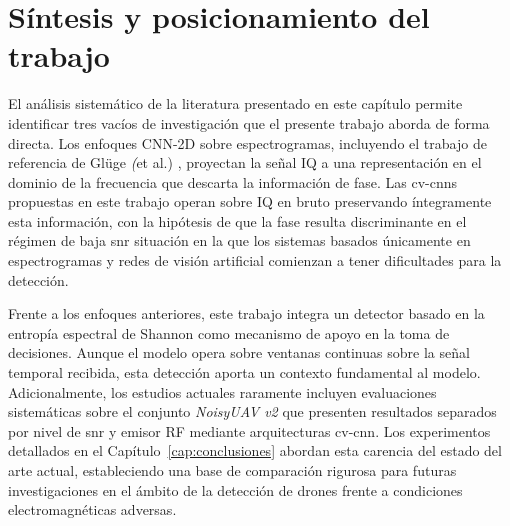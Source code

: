 \section{Síntesis y posicionamiento del trabajo}
\label{sec:sintesis_estado_arte}

El análisis sistemático de la literatura presentado en este capítulo permite identificar tres vacíos de investigación que el presente trabajo aborda de forma directa. Los enfoques CNN-2D sobre espectrogramas, incluyendo el trabajo de referencia de Glüge \textit(et al.) \cite{gluge_robust_2024}, proyectan la señal IQ a una representación en el dominio de la frecuencia que descarta la información de fase. Las \glspl{cv-cnn} propuestas en este trabajo operan sobre IQ en bruto preservando íntegramente esta información, con la hipótesis de que la fase resulta discriminante en el régimen de baja \gls{snr} situación en la que los sistemas basados únicamente en espectrogramas y redes de visión artificial comienzan a tener dificultades para la detección.

Frente a los enfoques anteriores, este trabajo integra un detector basado en la entropía espectral de Shannon como mecanismo de apoyo en la toma de decisiones. Aunque el modelo opera sobre ventanas continuas sobre la señal temporal recibida, esta detección aporta un contexto fundamental al modelo. Adicionalmente, los estudios actuales raramente incluyen evaluaciones sistemáticas sobre el conjunto \textit{NoisyUAV v2} que presenten resultados separados por nivel de \gls{snr} y emisor RF mediante arquitecturas \gls{cv-cnn}. Los experimentos detallados en el Capítulo~\ref{cap:conclusiones} abordan esta carencia del estado del arte actual, estableciendo una base de comparación rigurosa para futuras investigaciones en el ámbito de la detección de drones frente a condiciones electromagnéticas adversas.

